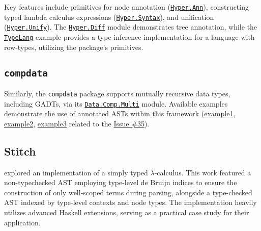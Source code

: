Key features include primitives for node annotation (\href{https://hackage.haskell.org/package/hypertypes-0.2.2/docs/Hyper-Combinator-Ann.html}{\texttt{Hyper.Ann}}), constructing typed lambda calculus expressions (\href{https://hackage.haskell.org/package/hypertypes-0.2.2/docs/Hyper-Syntax.html}{\texttt{Hyper.Syntax}}), and unification (\href{https://hackage.haskell.org/package/hypertypes-0.2.2/docs/Hyper-Unify.html}{\texttt{Hyper.Unify}}). The \href{https://github.com/lamdu/hypertypes/blob/06cf48ef9c85c54cbe722a448754cb89931b23e7/src/Hyper/Diff.hs}{\texttt{Hyper.Diff}} module demonstrates tree annotation, while the \href{https://github.com/lamdu/hypertypes/tree/06cf48ef9c85c54cbe722a448754cb89931b23e7/test/TypeLang.hs}{\texttt{TypeLang}} example provides a type inference implementation for a language with row-types, utilizing the package's primitives.

\subsection{\texttt{compdata}}
\label{chap:LiteratureReview:sec:AstRepresentations:Compdata}

Similarly, the \texttt{compdata} package \cite{compdata-hackage} supports mutually recursive data types, including GADTs, via its \href{https://hackage.haskell.org/package/compdata-0.13.1/docs/Data-Comp-Multi.html}{\texttt{Data.Comp.Multi}} module. Available examples demonstrate the use of annotated ASTs within this framework (\href{https://github.com/pa-ba/compdata/blob/e916a9ae847b37d7932669f9365de987d09fd9e0/src/Data/Comp/Multi.hs#L322}{example1}, \href{https://github.com/pa-ba/compdata/blob/e916a9ae847b37d7932669f9365de987d09fd9e0/examples/Examples/Multi/Desugar.hs}{example2}, \href{https://gist.github.com/liarokapisv/bb857a23ecd9df945690f73e0acfbe80}{example3} related to the \href{https://github.com/pa-ba/compdata/issues/35}{Issue \#35}).

\subsection{Stitch}
\label{chap:LiteratureReview:sec:AstRepresentations:Stitch}

\citeauthor{eisenberg-stitch-2020} \cite{eisenberg-stitch-2020} explored an implementation of a simply typed $\lambda$-calculus. This work featured a non-typechecked AST employing type-level de Bruijn indices to ensure the construction of only well-scoped terms during parsing, alongside a type-checked AST indexed by type-level contexts and node types. The implementation heavily utilizes advanced Haskell extensions, serving as a practical case study for their application.

